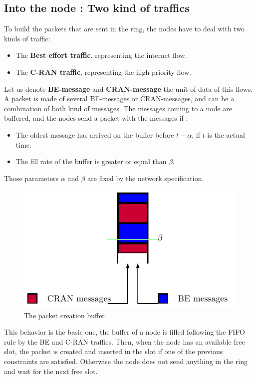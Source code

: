 \documentclass[a4paper,10pt]{article}
\begin{document}
  \subsection{Into the node : Two kind of traffics}
    To build the packets that are sent in the ring, the nodes have to deal with two kinds of traffic: 
    \begin{itemize}
    \item The {\bf Best effort traffic}, representing the internet flow.
    \item The {\bf C-RAN traffic}, representing the high priority flow.
    \end{itemize}
    Let us denote {\bf BE-message} and {\bf CRAN-message} the unit of data of this flows. A packet is made of several BE-messages or CRAN-messages, and can be a combination of both kind of messages.
    The messages coming to a node are buffered, and the nodes send a packet with the messages if : 
     \begin{itemize}
    \item The oldest message has arrived on the buffer before $t - \alpha$, if  $t$ is the actual time.
    \item The fill rate of the buffer is greater or equal than $\beta$.
    \end{itemize}
    Those parameters $\alpha$ and $\beta$ are fixed by the network specification.

    \begin{figure}[h!]
        \begin{center}
      \includegraphics[scale=0.5]{insertionbuff.pdf}

      \caption{The packet creation buffer}
      \end{center}
  \end{figure}

This behavior is the basic one, the buffer of a node is filled following the FIFO rule by the BE and C-RAN traffics. Then, when the node has an available free slot, the packet is created and inserted in the slot if one of the previous constraints are satisfied. Otherwise the node does not send anything in the ring and wait for the next free slot.
\end{document}
